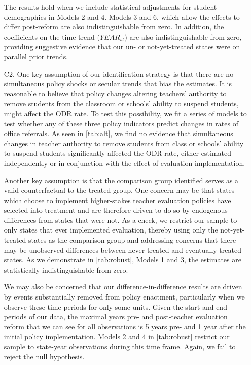 \documentclass[a4paper, 11pt]{article}
\begin{document}
\begin{enumerate}
The results hold when we include statistical adjustments for student demographics in Models 2 and 4. Models 3 and 6, which allow the effects to differ post-reform are also indistinguishable from zero. In addition, the coefficients on the time-trend ($YEAR_{st}$) are also indistinguishable from zero, providing suggestive evidence that our un- or not-yet-treated states were on parallel prior trends.



	\item[C2.] One key assumption of our identification strategy is that there are no simultaneous policy shocks or secular trends that bias the estimates. It is reasonable to believe that policy changes altering teachers' authority to remove students from the classroom or schools' ability to suspend students, might affect the ODR rate. To test this possibility, we fit a series of models to test whether any of these three policy indicators predict changes in rates of office referrals. As seen in \autoref{tab:alt}, we find no evidence that simultaneous changes in teacher authority to remove students from class or schools' ability to suspend students significantly affected the ODR rate, either estimated independently or in conjunction with the effect of evaluation implementation. 



Another key assumption is that the comparison group identified serves as a valid counterfactual to the treated group. One concern may be that states which choose to implement higher-stakes teacher evaluation policies have selected into treatment and are therefore driven to do so by endogenous differences from states that were not. As a check, we restrict our sample to only states that ever implemented evaluation, thereby using only the not-yet-treated states as the comparison group and addressing concerns that there may be unobserved differences between never-treated and eventually-treated states. As we demonstrate in \autoref{tab:robust}, Models 1 and 3, the estimates are statistically indistinguishable from zero. 

We may also be concerned that our difference-in-difference results are driven by events substantially removed from policy enactment, particularly when we observe these time periods for only some units. Given the start and end periods of our data, the maximal years pre- and post-teacher evaluation reform that we can see for all observations is 5 years pre- and 1 year after the initial policy implementation. Models 2 and 4 in \autoref{tab:robust} restrict our sample to state-year observations during this time frame. Again, we fail to reject the null hypothesis.


\end{enumerate}
\end{document}
